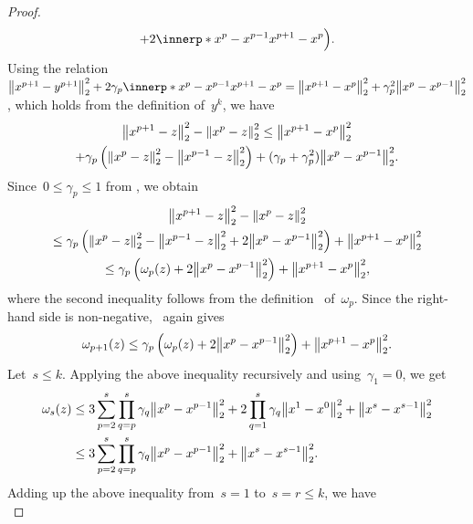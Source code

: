 \documentclass[../main]{subfiles}
\begin{document}
\begin{proof}
\begin{multline}
        + 2 \innerp*{x^p - x^{p - 1}}{x^{p + 1} - x^p} \Bigr)
        .\end{multline}
    Using the relation~$\norm*{x^{p + 1} - y^{p + 1}}_2^2 + 2 \gamma_p \innerp*{x^p - x^{p - 1}}{x^{p + 1} - x^p} = \norm*{x^{p + 1} - x^p}_2^2 + \gamma_p^2 \norm*{x^p - x^{p - 1}}_2^2$, which holds from the definition of~$y^k$, we have
    \begin{multline}
        \norm*{x^{p + 1} - z}_2^2 - \norm*{x^p - z}_2^2
        \le \norm*{x^{p + 1} - x^p}_2^2 \\
        + \gamma_p \left( \norm*{x^p - z}_2^2 - \norm*{x^{p - 1} - z}_2^2 \right) + ( \gamma_p + \gamma_p^2 ) \norm*{x^p - x^{p - 1}}_2^2
        .\end{multline}
    Since~$0 \le \gamma_p \le 1$ from , we obtain
    \begin{multline}
        \norm*{x^{p + 1} - z}_2^2 - \norm*{x^p - z}_2^2 \\
        \le \gamma_p \left( \norm*{x^p - z}_2^2 - \norm*{x^{p - 1} - z}_2^2 + 2 \norm*{x^p - x^{p - 1}}_2^2 \right) + \norm*{x^{p + 1} - x^p}_2^2 \\
        \le \gamma_p \left( \omega_p(z) + 2 \norm*{x^p - x^{p - 1}}_2^2 \right) + \norm*{x^{p + 1} - x^p}_2^2
        ,\end{multline}
    where the second inequality follows from the definition~ of~$\omega_p$.
    Since the right-hand side is non-negative,~ again gives
    \begin{equation}
        \omega_{p + 1}(z) \le \gamma_p \left( \omega_p(z) + 2 \norm*{x^p - x^{p - 1}}_2^2 \right) + \norm*{x^{p + 1} - x^p}_2^2
        .\end{equation}
    Let~$s \le k$.
    Applying the above inequality recursively and using~$\gamma_1 = 0$, we get
    \begin{equation}
        \begin{split}
            \omega_s(z) &\le 3 \sum_{p = 2}^{s} \prod_{q = p}^{s} \gamma_q \norm*{x^p - x^{p - 1}}_2^2 + 2 \prod_{q = 1}^{s} \gamma_q \norm*{x^1 - x^0}_2^2 + \norm*{x^s - x^{s - 1}}_2^2 \\
            &\le 3 \sum_{p = 2}^{s} \prod_{q = p}^{s} \gamma_q \norm*{x^p - x^{p - 1}}_2^2 + \norm*{x^s - x^{s - 1}}_2^2
            .\end{split}
    \end{equation}
    Adding up the above inequality from~$s = 1$ to~$s = r \le k$, we have
    \begin{equation}

\end{equation}
\end{proof}
\end{document}
